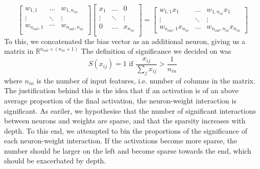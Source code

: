 \documentclass{article}
\begin{document}
                \[
                    \begin{bmatrix}
                        w_{1,1} & \dots & w_{1,n_{in}} \\
                        \vdots & \ddots & \vdots \\
                        w_{n_{out}, 1} & \cdots & w_{n_{out}, n_{in}} \\
                    \end{bmatrix}
                    \begin{bmatrix}
                        x_1  & \dots & 0 \\
                        \vdots & \ddots & \vdots \\
                        0 & \dots & x_{n_{in}} \\
                    \end{bmatrix}
                    = 
                    \begin{bmatrix}
                        w_{1,1}x_1  & \dots & w_{1,n_{in}}x_1 \\
                        \vdots & \ddots & \vdots \\
                        w_{n_{out}, 1}x_{n_{in}} & \dots & w_{n_{out}, n_{in}}x_{n_{in}} 
                    \end{bmatrix}\]
            To this, we concatenated the bias vector as an additional neuron, giving us a matrix in $\mathbb{R}^{n_{out} \times (n_{in} + 1)}$
            The definition of significance we decided on was 
            \[S(x_{ij}) = 1 \text{ if } \frac{x_{ij}}{\sum_j x_{ij}} > \frac{1}{n_{in}} \]
            where $n_{in}$ is the number of input features, i.e. number of columns in the matrix. The justification behind this is the idea that if an activation is of an above average proportion of the final activation, the neuron-weight interaction is significant.
            As eariler, we hypothesise that the number of significant interactions between neurons and weights are sparse, and that the sparsity increases with depth. To this end, we attempted to bin the proportions of the significance of each neuron-weight interaction. If the activations become more sparse, the number should be larger on the left and become sparse towards the end, which should be exacerbated by depth. 
            
\end{document}
